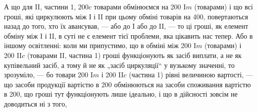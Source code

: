 А що для II, частини 1, $200 c$ товарами обмінюємся на 200 I$m$
(товарами) і що всі гроші, які циркулюють між І і II при цьому обміні
товарів на 400, повертаються назад до того, хто їх авансував, — або до
I або до II, — то ці гроші, як елемент обміну між I і II, в суті не є
елемент тієї проблеми, яка цікавить нас тепер. Або в іншому освітленні:
коли ми припустимо, що в обміні між 200 I$m$ (товарами) і 200 II$c$
(товарами II, частина 1) гроші функціонують як засіб виплати, а не як
купівельний засіб, а тому й не як „засіб циркуляції“ у вузькому значенні,
то зрозуміло, — бо товари 200 I$m$ і 200 II$c$ (частина 1)
рівні величиною вартості, — що засоби продукції вартістю в 200 обмінюються
на засоби споживання вартістю в 200, що гроші тут функціонують
лише ідеально, і що в дійсності зовсім не доводиться ні з того,
\parbreak{}  %

